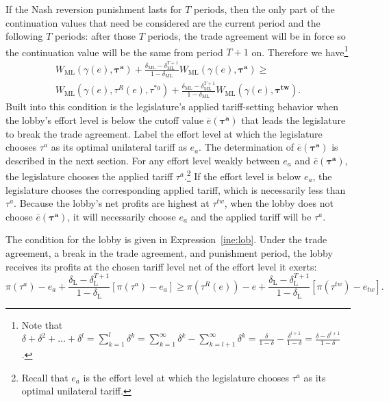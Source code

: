 \documentclass[authoryear, review]{elsarticle}
\newcommand{\ov}{\overline}
\newcommand{\bta}{\bm{\tau^a}}
\newcommand{\ga}{\gamma}
\newcommand{\btw}{\bm{\tau^{tw}}}
\newcommand{\de}{\delta}
\begin{document}
If the Nash reversion punishment lasts for $T$ periods, then the only part of the continuation values that need be considered are the current period and the following $T$ periods: after those $T$ periods, the trade agreement will be in force so the continuation value will be the same from period $T+1$ on. Therefore we have\footnote{Note that $\de + \de^2 + \ldots + \de^l = \sum_{k=1}^l \de^k= \sum_{k=1}^\infty \de^k - \sum_{k=l+1}^\infty \de^k = \frac{\de}{1-\de} - \frac{\de^{l+1}}{1-\de} = \frac{\de - \de^{l+1}}{1-\de} $.}
\begin{multline}
  W_\text{ML}(\ga(e),\bta) + \frac{\de_\text{ML} - \de_\text{ML}^{T+1}}{1-\de_\text{ML}} W_\text{ML}(\ga(e),\bta) \geq \\
	W_\text{ML}(\ga(e),\tau^R(e),\tau^{*a}) + \frac{\de_\text{ML} - \de_\text{ML}^{T+1}}{1-\de_\text{ML}} W_\text{ML}(\ga(e),\btw).
  \label{ine:leg}
\end{multline}
Built into this condition is the legislature's applied tariff-setting behavior when the lobby's effort level is below the cutoff value $\ov{e}(\bta)$ that leads the legislature to break the trade agreement. Label the effort level at which the legislature chooses $\tau^a$ as its optimal unilateral tariff as $e_a$. The determination of $\ov{e}(\bta)$ is described in the next section. For any effort level weakly between $e_a$ and $\ov{e}(\bta)$, the legislature chooses the applied tariff $\tau^a$.\footnote{Recall that $e_a$ is the effort level at which the legislature chooses $\tau^a$ as its optimal unilateral tariff.} If the effort level is below $e_a$, the legislature chooses the corresponding applied tariff, which is necessarily less than $\tau^a$. Because the lobby's net profits are highest at $\tau^{tw}$, when the lobby does not choose $\ov{e}(\bta)$, it will necessarily choose $e_a$ and the applied tariff will be $\tau^a$.

The condition for the lobby is given in Expression~\ref{ine:lob}. Under the trade agreement, a break in the trade agreement, and punishment period, the lobby receives its profits at the chosen tariff level net of the effort level it exerts:
\begin{equation}
  \pi(\tau^a) - e_a + \frac{\de_\text{L} - \de_\text{L}^{T+1}}{1-\de_\text{L}} \left[\pi(\tau^a) - e_a \right] \geq \pi(\tau^R(e)) - e + \frac{\de_\text{L} - \de_\text{L}^{T+1}}{1-\de_\text{L}} \left[\pi(\tau^{tw}) - e_{tw} \right] .
  \label{ine:lob}
\end{equation}
\end{document}
